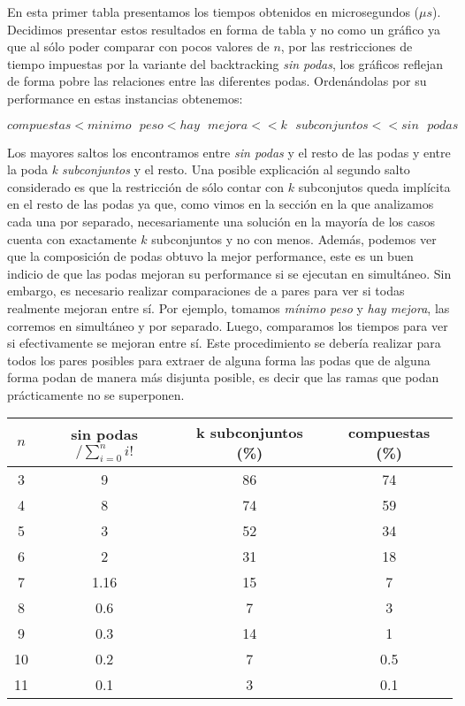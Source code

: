 En esta primer tabla presentamos los tiempos obtenidos en microsegundos ($\mu s$). Decidimos presentar estos resultados
en forma de tabla y no como un gráfico ya que al sólo poder comparar con pocos valores de $n$, por las restricciones de
tiempo impuestas por la variante del backtracking \textit{sin podas}, los gráficos reflejan de forma pobre las relaciones
entre las diferentes podas. Ordenándolas por su performance en estas instancias obtenemos:

\begin{displaymath}
  compuestas < minimo\text{ }peso < hay\text{ }mejora << k\text{ }subconjuntos << sin\text{ }podas
\end{displaymath}

Los mayores saltos los encontramos entre \textit{sin podas} y el resto de las podas y entre la poda \textit{k subconjuntos}
y el resto. Una posible explicación al segundo salto considerado es que la restricción de sólo contar con $k$ subconjutos
queda implícita en el resto de las podas ya que, como vimos en la sección en la que analizamos cada una por separado,
necesariamente una solución en la mayoría de los casos cuenta con exactamente $k$ subconjuntos y no con menos. Además, 
podemos ver que la composición de podas obtuvo la mejor performance, este es un buen indicio de que las podas mejoran
su performance si se ejecutan en simultáneo. Sin embargo, es necesario realizar comparaciones de a pares para ver 
si todas realmente mejoran entre sí. Por ejemplo, tomamos \textit{mínimo peso} y \textit{hay mejora}, las corremos 
en simultáneo y por separado. Luego, comparamos los tiempos para ver si efectivamente se mejoran entre sí. Este
procedimiento se debería realizar para todos los pares posibles para extraer de alguna forma las podas que de alguna
forma podan de manera más disjunta posible, es decir que las ramas que podan prácticamente no se superponen.

\begin{center}
  \begin{tabular}{ c | c | c | c}
    $n$ & sin podas$ / \sum_{i=0}^ni!$ & k subconjuntos (\%) & compuestas (\%) \tabularnewline \hline
    3 & 9 & 86 & 74 \tabularnewline \hline
    4 & 8 & 74 & 59 \tabularnewline \hline
    5 & 3 & 52 & 34 \tabularnewline \hline
    6 & 2 & 31 & 18 \tabularnewline \hline 
    7 & 1.16 & 15 & 7 \tabularnewline \hline 
    8 & 0.6 & 7 & 3 \tabularnewline \hline
    9 & 0.3 & 14 & 1 \tabularnewline \hline
    10 & 0.2  & 7 & 0.5 \tabularnewline \hline
    11 & 0.1 & 3 & 0.1
  \end{tabular}
\end{center}

